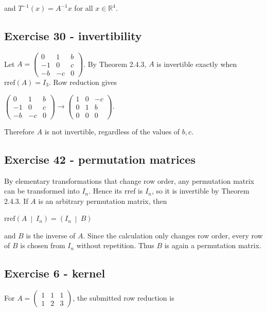 and \(T^{- 1}(x) = A^{- 1}x\) for all \(x \in \mathbb{R}^{4}\).

\subsection{Exercise 30 - invertibility}

Let \(A = \begin{pmatrix}
0 & 1 & b \\
{- 1} & 0 & c \\
{- b} & {- c} & 0
\end{pmatrix}\). By Theorem 2.4.3, \(A\) is invertible exactly when \(\text{rref}(A) = I_{3}\). Row reduction gives

\(\begin{pmatrix}
0 & 1 & b \\
{- 1} & 0 & c \\
{- b} & {- c} & 0
\end{pmatrix}\rightarrow\begin{pmatrix}
1 & 0 & {- c} \\
0 & 1 & b \\
0 & 0 & 0
\end{pmatrix}.\)

Therefore \(A\) is not invertible, regardless of the values of \(b,c\).

\subsection{Exercise 42 - permutation matrices}

By elementary transformations that change row order, any permutation matrix can be transformed into \(I_{n}\). Hence its rref is \(I_{n}\), so it is invertible by Theorem 2.4.3. If \(A\) is an arbitrary permutation matrix, then

\(\text{rref}\left( A\  \middle| \ I_{n} \right) = \left( I_{n}\  \middle| \ B \right)\)

and \(B\) is the inverse of \(A\). Since the calculation only changes row order, every row of \(B\) is chosen from \(I_{n}\) without repetition. Thus \(B\) is again a permutation matrix.

\subsection{Exercise 6 - kernel}

For \(A = \begin{pmatrix}
1 & 1 & 1 \\
1 & 2 & 3
\end{pmatrix}\), the submitted row reduction is

